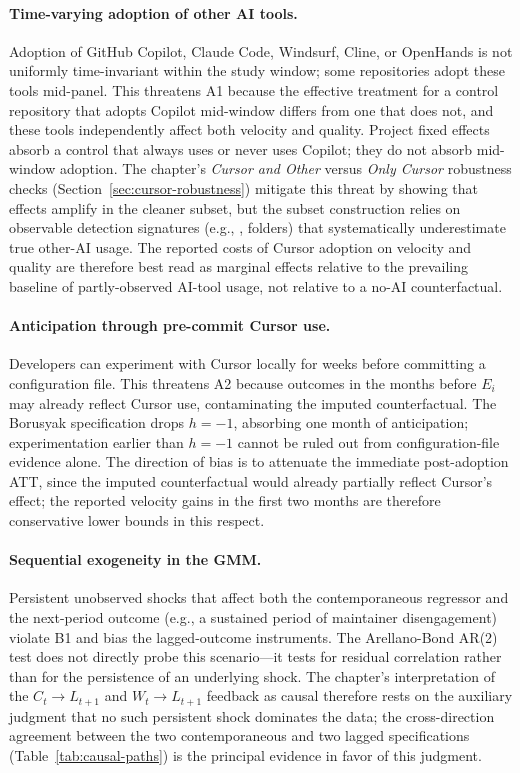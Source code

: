 \paragraph{Time-varying adoption of other AI tools.}
Adoption of GitHub Copilot, Claude Code, Windsurf, Cline, or OpenHands is not uniformly time-invariant within the study window; some repositories adopt these tools mid-panel.
This threatens A1 because the effective treatment for a control repository that adopts Copilot mid-window differs from one that does not, and these tools independently affect both velocity and quality.
Project fixed effects absorb a control that always uses or never uses Copilot; they do not absorb mid-window adoption.
The chapter's \emph{Cursor and Other} versus \emph{Only Cursor} robustness checks (Section~\ref{sec:cursor-robustness}) mitigate this threat by showing that effects amplify in the cleaner subset, but the subset construction relies on observable detection signatures (e.g., ,  folders) that systematically underestimate true other-AI usage.
The reported costs of Cursor adoption on velocity and quality are therefore best read as marginal effects relative to the prevailing baseline of partly-observed AI-tool usage, not relative to a no-AI counterfactual.

\paragraph{Anticipation through pre-commit Cursor use.}
Developers can experiment with Cursor locally for weeks before committing a configuration file.
This threatens A2 because outcomes in the months before $E_i$ may already reflect Cursor use, contaminating the imputed counterfactual.
The Borusyak specification drops $h=-1$, absorbing one month of anticipation; experimentation earlier than $h=-1$ cannot be ruled out from configuration-file evidence alone.
The direction of bias is to attenuate the immediate post-adoption ATT, since the imputed counterfactual would already partially reflect Cursor's effect; the reported velocity gains in the first two months are therefore conservative lower bounds in this respect.

\paragraph{Sequential exogeneity in the GMM.}
Persistent unobserved shocks that affect both the contemporaneous regressor and the next-period outcome (e.g., a sustained period of maintainer disengagement) violate B1 and bias the lagged-outcome instruments.
The Arellano-Bond AR(2) test does not directly probe this scenario---it tests for residual correlation rather than for the persistence of an underlying shock.
The chapter's interpretation of the $C_t \to L_{t+1}$ and $W_t \to L_{t+1}$ feedback as causal therefore rests on the auxiliary judgment that no such persistent shock dominates the data; the cross-direction agreement between the two contemporaneous and two lagged specifications (Table~\ref{tab:causal-paths}) is the principal evidence in favor of this judgment.

